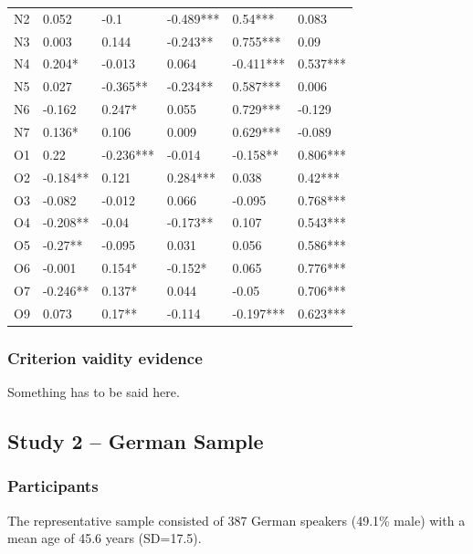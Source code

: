 \documentclass[,man,floatsintext]{apa6}
\theoremstyle{definition}
\theoremstyle{definition}
\theoremstyle{definition}
\theoremstyle{remark}
\begin{document}
\begin{table}[ht]
\begin{tabular}{llllll}
  N2 & 0.052 & -0.1 & -0.489*** & 0.54*** & 0.083 \\ 
  N3 & 0.003 & 0.144 & -0.243** & 0.755*** & 0.09 \\ 
  N4 & 0.204* & -0.013 & 0.064 & -0.411*** & 0.537*** \\ 
  N5 & 0.027 & -0.365** & -0.234** & 0.587*** & 0.006 \\ 
  N6 & -0.162 & 0.247* & 0.055 & 0.729*** & -0.129 \\ 
  N7 & 0.136* & 0.106 & 0.009 & 0.629*** & -0.089 \\ 
  O1 & 0.22 & -0.236*** & -0.014 & -0.158** & 0.806*** \\ 
  O2 & -0.184** & 0.121 & 0.284*** & 0.038 & 0.42*** \\ 
  O3 & -0.082 & -0.012 & 0.066 & -0.095 & 0.768*** \\ 
  O4 & -0.208** & -0.04 & -0.173** & 0.107 & 0.543*** \\ 
  O5 & -0.27** & -0.095 & 0.031 & 0.056 & 0.586*** \\ 
  O6 & -0.001 & 0.154* & -0.152* & 0.065 & 0.776*** \\ 
  O7 & -0.246** & 0.137* & 0.044 & -0.05 & 0.706*** \\ 
  O9 & 0.073 & 0.17** & -0.114 & -0.197*** & 0.623*** \\ 
   \hline
\end{tabular}
\endgroup
\end{table}

\hypertarget{criterion-vaidity-evidence}{%
\subsubsection{Criterion vaidity
evidence}\label{criterion-vaidity-evidence}}

Something has to be said here.

\hypertarget{study-2-german-sample}{%
\subsection{Study 2 -- German Sample}\label{study-2-german-sample}}

\hypertarget{participants-1}{%
\subsubsection{Participants}\label{participants-1}}

The representative sample consisted of 387 German speakers (49.1\% male)
with a mean age of 45.6 years (SD=17.5).
\end{document}
